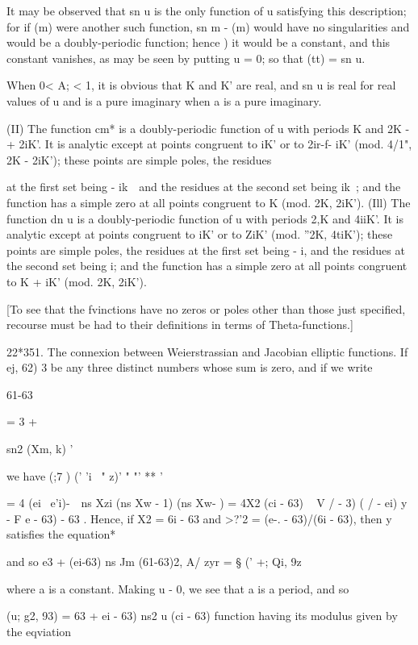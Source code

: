 It may be observed that sn u is the only function of u satisfying this
description; for if (m) were another such function, sn m - (m) would
have no singularities and would be a doubly-periodic function; hence
) it would be a constant, and this constant vanishes, as may
be seen by putting u = 0; so that (tt) = sn u.

When 0< A; < 1, it is obvious that K and K' are real, and sn u is real
for real values of u and is a pure imaginary when a is a pure
imaginary.

(II) The function cm* is a doubly-periodic function of u with periods
K and 2K -+ 2iK'. It is analytic except at points congruent to iK' or
to 2ir-f- iK' (mod. 4/1", 2K - 2iK'); these points are simple poles,
the residues

%
%

at the first set being - ik~\ and the residues at the second set being
ik~; and the function has a simple zero at all points congruent to K
(mod. 2K, 2iK'). (Ill) The function dn u is a doubly-periodic function
of u with periods 2,K and 4iiK'. It is analytic except at points
congruent to iK' or to ZiK' (mod. ''2K, 4tiK'); these points are
simple poles, the residues at the first set being - i, and the
residues at the second set being i; and the function has a simple
zero at all points congruent to K + iK' (mod. 2K, 2iK').

[To see that the fvinctions have no zeros or poles other than those
just specified, recourse must be had to their definitions in terms of
Theta-functions.]

22*351. The connexion between Weierstrassian and Jacobian elliptic
functions. If ej, 62) 3 be any three distinct numbers whose sum is
zero, and if we write

61-63

  = 3 +

sn2 (Xm, k) '

we have (;7 ) (' 'i ~" z)' " "' ** '

= 4 (ei ~e'i)-\ \ ns Xzi (ns Xw - 1) (ns Xw- ) = 4X2 (ci - 63) ~ V / -
3) ( / - ei) y - F e - 63) - 63 . Hence, if X2 = 6i - 63 and >?'2 =
(e-. - 63)/(6i - 63), then y satisfies the equation*

and so e3 + (ei-63) ns Jm (61-63)2, A/ zyr = § (' +; Qi, 9z\

where a is a constant. Making u - 0, we see that a is a period, and so

  (u; g2, 93) = 63 + ei - 63) ns2 u (ci - 63)%
function having its modulus given by the eqviation

